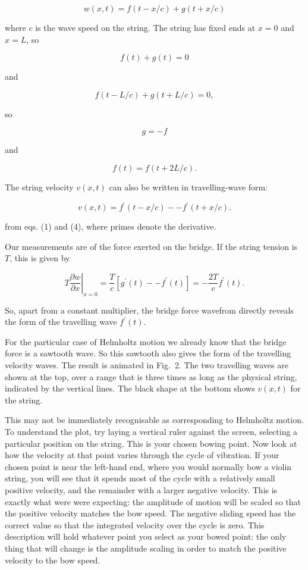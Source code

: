   $$w(x,t)=f(t-x/c)+g(t+x/c) \tag{1}$$ 

  where $c$ is the wave speed on the string. The string has fixed ends at $x=0$ 
  and $x=L$, so 

  $$f(t)+g(t)=0 \tag{2}$$ 

  and 

  $$f(t-L/c)+g(t+L/c)=0 , \tag{3}$$ 

  so 

  $$g=-f \tag{4}$$ 

  and 

  $$f(t)=f(t+2L/c) . \tag{5}$$ 

  The string velocity $v(x,t)$ can also be written in travelling-wave form: 

  $$v(x,t)=f^\prime(t-x/c) -- f^\prime(t+x/c) . \tag{6}$$ 

  from eqs. (1) and (4), where primes denote the derivative. 

  Our measurements are of the force exerted on the bridge. If the string 
  tension is $T$, this is given by 

  $$T \left.\dfrac{\partial w}{\partial x} \right|_{x=0} = \dfrac{T}{c} \left[ 
  g^\prime(t) -- f^\prime(t) \right]=-\dfrac{2T}{c}f^\prime(t) . \tag{7}$$ 

  So, apart from a constant multiplier, the bridge force wavefrom directly 
  reveals the form of the travelling wave $f^\prime(t)$. 

  For the particular case of Helmholtz motion we already know that the bridge 
  force is a sawtooth wave. So this sawtooth also gives the form of the 
  travelling velocity waves. The result is animated in Fig.\ 2. The two 
  travelling waves are shown at the top, over a range that is three times as 
  long as the physical string, indicated by the vertical lines. The black shape 
  at the bottom shows $v(x,t)$ for the string. 

  This may not be immediately recognisable as corresponding to Helmholtz 
  motion. To understand the plot, try laying a vertical ruler against the 
  screen, selecting a particular position on the string. This is your chosen 
  bowing point. Now look at how the velocity at that point varies through the 
  cycle of vibration. If your chosen point is near the left-hand end, where you 
  would normally bow a violin string, you will see that it spends most of the 
  cycle with a relatively small positive velocity, and the remainder with a 
  larger negative velocity. This is exactly what were were expecting: the 
  amplitude of motion will be scaled so that the positive velocity matches the 
  bow speed. The negative sliding speed has the correct value so that the 
  integrated velocity over the cycle is zero. This description will hold 
  whatever point you select as your bowed point: the only thing that will 
  change is the amplitude scaling in order to match the positive velocity to 
  the bow speed. 

